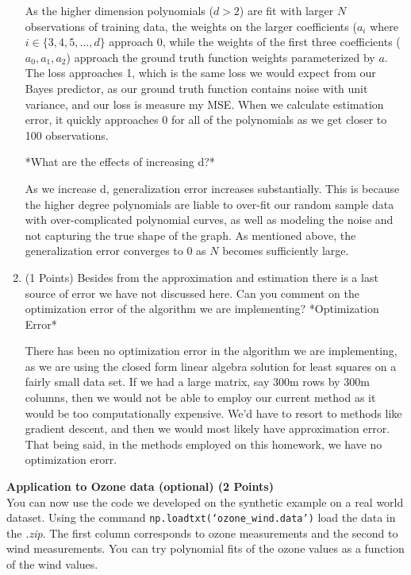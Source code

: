 \documentclass{article}
\begin{document}
\begin{enumerate}
As the higher dimension polynomials ($d >2$) are fit with larger $N$ observations of training data, the weights on the larger coefficients ($a_i$ where $i \in \{3,4,5,\dots, d\}$ approach $0$, while the weights of the first three coefficients ($a_0, a_1, a_2$) approach the ground truth function weights parameterized by $a$. The loss approaches 1, which is the same loss we would expect from our Bayes predictor, as our ground truth function contains noise with unit variance, and our loss is measure my MSE. When we calculate estimation error, it quickly approaches 0 for all of the polynomials as we get closer to 100 observations.

*What are the effects of increasing d?*

As we increase d, generalization error increases substantially. This is because the higher degree polynomials are liable to over-fit our random sample data with over-complicated polynomial curves, as well as modeling the noise and not capturing the true shape of the graph. As mentioned above, the generalization error converges to 0 as $N$ becomes sufficiently large. 

    \item (1 Points) Besides from the approximation and estimation there is a last source of error we have not discussed here. Can you comment on the optimization error of the algorithm we are implementing?
    \subitem
    *Optimization Error*

There has been no optimization error in the algorithm we are implementing, as we are using the closed form linear algebra solution for least squares on a fairly small data set. If we had a large matrix, say 300m rows by 300m columns, then we would not be able to employ our current method as it would be too computationally expensive. We'd have to resort to methods like gradient descent, and then we would most likely have approximation error. That being said, in the methods employed on this homework, we have no optimization erorr.
    
\setcounter{saveenum}{\value{enumi}}    
\end{enumerate}

\textbf{\color{nyupurple} Application to Ozone data (optional) (2 Points)}\\
You can now use the code we developed on the synthetic example on a real world dataset. Using the command \texttt{np.loadtxt(`ozone\_wind.data')} load the data in the \emph{.zip}. The first column corresponds to ozone measurements and the second to wind measurements. You can try polynomial fits of the ozone values as a function of the wind values. 
\end{document}

